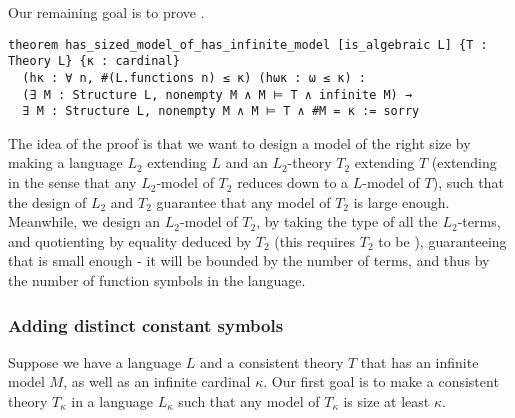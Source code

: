 Our remaining goal is to prove
.

\begin{lstlisting}
theorem has_sized_model_of_has_infinite_model [is_algebraic L] {T : Theory L} {κ : cardinal}
  (hκ : ∀ n, #(L.functions n) ≤ κ) (hωκ : ω ≤ κ) :
  (∃ M : Structure L, nonempty M ∧ M ⊨ T ∧ infinite M) →
  ∃ M : Structure L, nonempty M ∧ M ⊨ T ∧ #M = κ := sorry \end{lstlisting}

The idea of the proof is that we want to design a model of the right size
by making a language $L_{2}$ extending $L$ and an $L_{2}$-theory $T_{2}$ extending $T$
(extending in the sense that any $L_{2}$-model of $T_{2}$ reduces down to a $L$-model of $T$),
such that the design of $L_{2}$ and $T_{2}$ guarantee that any model of $T_{2}$ is large enough.
Meanwhile, we design an $L_{2}$-model  of $T_{2}$,
by taking the type of all the $L_{2}$-terms,
and quotienting by equality deduced by $T_{2}$ (this requires $T_{2}$ to be ),
guaranteeing that  is small enough
- it will be bounded by the number of terms,
and thus by the number of function symbols in the language.

\subsubsection{Adding distinct constant symbols}

Suppose we have a language $L$ and a consistent theory $T$ that has
an infinite model $M$, as well as an infinite cardinal $\kappa$.
Our first goal is to make a consistent theory $T_\kappa$
in a language $L_{\kappa}$ such that any model of $T_{\kappa}$
is size at least $\kappa$.


